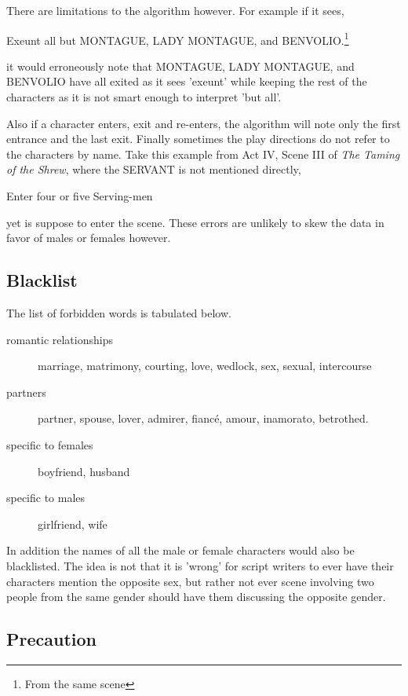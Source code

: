 \documentclass[12pt]{article}
\begin{document}
There are limitations to the algorithm however. For example if it sees,
\begin{displayquote}
Exeunt all but MONTAGUE, LADY MONTAGUE, and BENVOLIO.\footnote{From
the same scene}
\end{displayquote}
it would erroneously note that MONTAGUE, LADY MONTAGUE, and BENVOLIO have all
exited as it sees 'exeunt' while keeping the rest of the characters as it is
not smart enough to interpret 'but all'. 

Also if a character enters, exit and re-enters, the algorithm will note only
the first entrance and the last exit. Finally sometimes the play directions do
not refer to the characters by name. Take this example from Act IV, Scene III
of \emph{The Taming of the Shrew}, where the SERVANT is not mentioned directly,
\begin{displayquote}
Enter four or five Serving-men
\end{displayquote}
yet is suppose to enter the scene. These errors are unlikely to skew the data
in favor of males or females however.

\subsection{Blacklist}
\label{sub:blacklist}

The list of forbidden words is tabulated below. 
\begin{description}
    \item[romantic relationships] marriage,
        matrimony, courting, love, wedlock, sex, sexual, intercourse
    \item[partners] partner, spouse, lover,
        admirer, fiancé, amour, inamorato, betrothed. 
    \item[specific to females] boyfriend, husband
    \item[specific to males] girlfriend, wife
\end{description}

In addition the names of all the male or female characters would also be
blacklisted. The idea is not that it is 'wrong' for script writers to ever have
their characters mention the opposite sex, but rather not ever scene involving
two people from the same gender should have them discussing the opposite
gender.

\subsection{Precaution}
\label{sub:Precautions}
\end{document}
